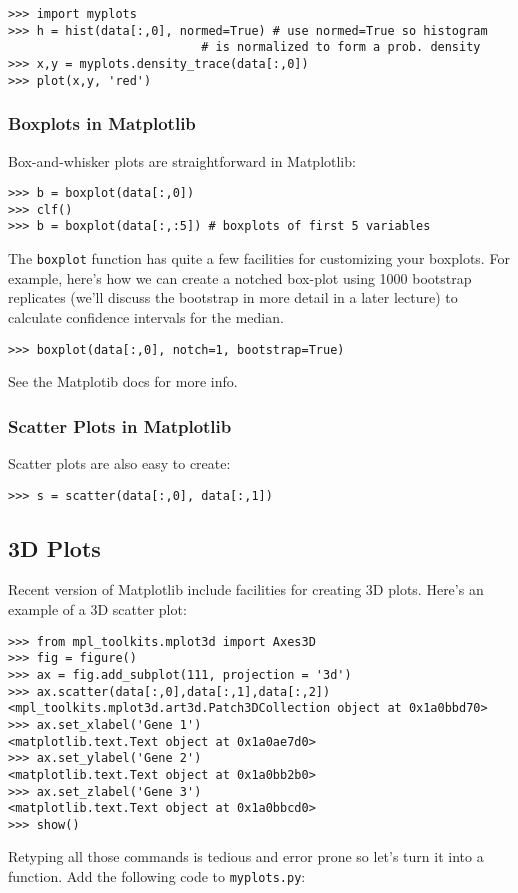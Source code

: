 \documentclass{article}
\begin{document}
\begin{lstlisting}
>>> import myplots
>>> h = hist(data[:,0], normed=True) # use normed=True so histogram 
                           # is normalized to form a prob. density
>>> x,y = myplots.density_trace(data[:,0])
>>> plot(x,y, 'red')    
\end{lstlisting}
\subsubsection{Boxplots in Matplotlib}

Box-and-whisker plots are straightforward in Matplotlib:

\begin{lstlisting}
>>> b = boxplot(data[:,0])
>>> clf()
>>> b = boxplot(data[:,:5]) # boxplots of first 5 variables
\end{lstlisting}
The \lstinline!boxplot! function has quite a few facilities for
customizing your boxplots. For example, here's how we can create a
notched box-plot using 1000 bootstrap replicates (we'll discuss the
bootstrap in more detail in a later lecture) to calculate confidence
intervals for the median.

\begin{lstlisting}
>>> boxplot(data[:,0], notch=1, bootstrap=True)    
\end{lstlisting}
See the Matplotib docs for more info.

\subsubsection{Scatter Plots in Matplotlib}

Scatter plots are also easy to create:

\begin{lstlisting}
>>> s = scatter(data[:,0], data[:,1])    
\end{lstlisting}
\subsection{3D Plots}

Recent version of Matplotlib include facilities for creating 3D plots.
Here's an example of a 3D scatter plot:

\begin{lstlisting}
>>> from mpl_toolkits.mplot3d import Axes3D
>>> fig = figure()
>>> ax = fig.add_subplot(111, projection = '3d')
>>> ax.scatter(data[:,0],data[:,1],data[:,2])
<mpl_toolkits.mplot3d.art3d.Patch3DCollection object at 0x1a0bbd70>
>>> ax.set_xlabel('Gene 1')
<matplotlib.text.Text object at 0x1a0ae7d0>
>>> ax.set_ylabel('Gene 2')
<matplotlib.text.Text object at 0x1a0bb2b0>
>>> ax.set_zlabel('Gene 3')
<matplotlib.text.Text object at 0x1a0bbcd0>
>>> show()
\end{lstlisting}
Retyping all those commands is tedious and error prone so let's turn it
into a function. Add the following code to \lstinline!myplots.py!:
\end{document}
